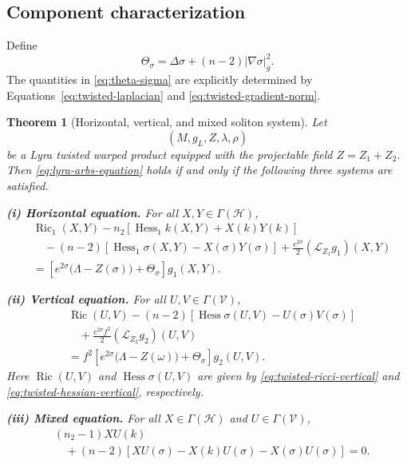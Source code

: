 \documentclass[a4paper,11pt]{article}
\theoremstyle{plain}
\newtheorem{theorem}{Theorem}[section]
\numberwithin{equation}{section}
\begin{document}
\subsection{Component characterization}
\label{subsec:lyra-arbs-components}

Define
\begin{equation}
	\Theta_{\sigma}
	=
	\Delta\sigma
	+
	(n-2)
	\lvert\nabla\sigma\rvert_{g}^{2}.
	\label{eq:theta-sigma}
\end{equation}
The quantities in \eqref{eq:theta-sigma} are explicitly determined
by Equations~\eqref{eq:twisted-laplacian} and
\eqref{eq:twisted-gradient-norm}.

\begin{theorem}[Horizontal, vertical, and mixed soliton system]
	\label{thm:lyra-arbs-component-characterization}
	Let
	\[
	(M,g_{L},Z,\lambda,\rho)
	\]
	be a Lyra twisted warped product equipped with the projectable
	field \(Z=Z_{1}+Z_{2}\). Then
	\eqref{eq:lyra-arbs-equation} holds if and only if the following
	three systems are satisfied.
	
	\medskip
	\noindent
	\textnormal{\textbf{(i) Horizontal equation.}}
	For all \(X,Y\in\Gamma(\mathcal H)\),
	\begin{align}
		&\operatorname{Ric}_{1}(X,Y)
		-
		n_{2}
		\left[
		\operatorname{Hess}_{1}k(X,Y)
		+
		X(k)Y(k)
		\right]
		\nonumber\\
		&\quad
		-
		(n-2)
		\left[
		\operatorname{Hess}_{1}\sigma(X,Y)
		-
		X(\sigma)Y(\sigma)
		\right]
		+
		\frac{e^{2\sigma}}{2}
		(\mathcal L_{Z_{1}}g_{1})(X,Y)
		\nonumber\\
		&=
		\left[
		e^{2\sigma}
		\bigl(
		\Lambda-Z(\sigma)
		\bigr)
		+
		\Theta_{\sigma}
		\right]
		g_{1}(X,Y).
		\label{eq:lyra-arbs-horizontal}
	\end{align}
	
	\medskip
	\noindent
	\textnormal{\textbf{(ii) Vertical equation.}}
	For all \(U,V\in\Gamma(\mathcal V)\),
	\begin{align}
		&\operatorname{Ric}(U,V)
		-
		(n-2)
		\left[
		\operatorname{Hess}\sigma(U,V)
		-
		U(\sigma)V(\sigma)
		\right]
		\nonumber\\
		&\quad
		+
		\frac{e^{2\sigma}f^{2}}{2}
		(\mathcal L_{Z_{2}}g_{2})(U,V)
		\nonumber\\
		&=
		f^{2}
		\left[
		e^{2\sigma}
		\bigl(
		\Lambda-Z(\omega)
		\bigr)
		+
		\Theta_{\sigma}
		\right]
		g_{2}(U,V).
		\label{eq:lyra-arbs-vertical}
	\end{align}
	Here \(\operatorname{Ric}(U,V)\) and
	\(\operatorname{Hess}\sigma(U,V)\) are given by
	\eqref{eq:twisted-ricci-vertical} and
	\eqref{eq:twisted-hessian-vertical}, respectively.
	
	\medskip
	\noindent
	\textnormal{\textbf{(iii) Mixed equation.}}
	For all
	\(X\in\Gamma(\mathcal H)\) and
	\(U\in\Gamma(\mathcal V)\),
	\begin{align}
		&(n_{2}-1)XU(k)
		\nonumber\\
		&\quad
		+
		(n-2)
		\left[
		XU(\sigma)
		-
		X(k)U(\sigma)
		-
		X(\sigma)U(\sigma)
		\right]
		=
		0.
		\label{eq:lyra-arbs-mixed}
	\end{align}
\end{theorem}
\end{document}
